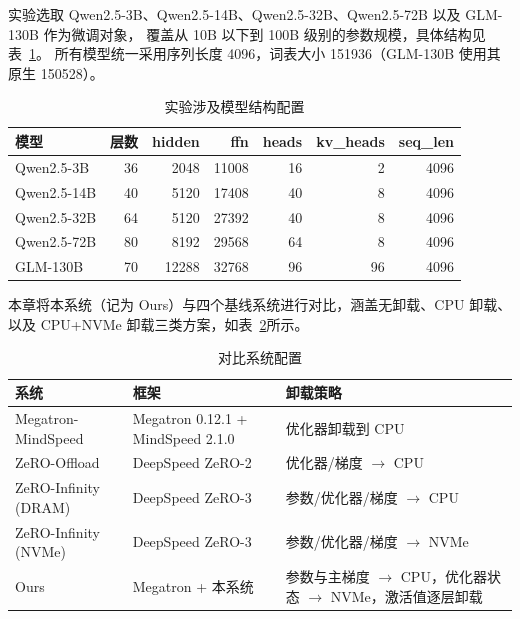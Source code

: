 \documentclass[bachelor,openany,oneside,color,AutoFakeBold=true]{buaathesis}
\begin{document}
实验选取 Qwen2.5-3B、Qwen2.5-14B、Qwen2.5-32B、Qwen2.5-72B 以及 GLM-130B 作为微调对象，
覆盖从 10B 以下到 100B 级别的参数规模，具体结构见表~\ref{tab:model}。
所有模型统一采用序列长度 4096，词表大小 151936（GLM-130B 使用其原生 150528）。

\begin{table}[!htbp]
  \centering
  \caption{实验涉及模型结构配置}
  \label{tab:model}
  \setlength{\tabcolsep}{4pt}
  \begin{tabular}{lrrrrrr}
    \toprule
    模型 & 层数 & hidden & ffn & heads & kv\_heads & seq\_len \\
    \midrule
    Qwen2.5-3B   & 36 & 2048  & 11008 & 16 & 2  & 4096 \\
    Qwen2.5-14B  & 40 & 5120  & 17408 & 40 & 8  & 4096 \\
    Qwen2.5-32B  & 64 & 5120  & 27392 & 40 & 8  & 4096 \\
    Qwen2.5-72B  & 80 & 8192  & 29568 & 64 & 8  & 4096 \\
    GLM-130B   & 70 & 12288 & 32768 & 96 & 96 & 4096 \\
    \bottomrule
  \end{tabular}
\end{table}

本章将本系统（记为 Ours）与四个基线系统进行对比，涵盖无卸载、CPU 卸载、
以及 CPU+NVMe 卸载三类方案，如表~\ref{tab:baseline}所示。

\begin{table}[!htbp]
  \centering
  \caption{对比系统配置}
  \label{tab:baseline}
  \begin{tabular}{lll}
    \toprule
    系统 & 框架 & 卸载策略 \\
    \midrule
    Megatron-MindSpeed   & Megatron 0.12.1 + MindSpeed 2.1.0 & 优化器卸载到 CPU \\
    ZeRO-Offload         & DeepSpeed ZeRO-2 & 优化器/梯度 $\rightarrow$ CPU \\
    ZeRO-Infinity (DRAM) & DeepSpeed ZeRO-3 & 参数/优化器/梯度 $\rightarrow$ CPU \\
    ZeRO-Infinity (NVMe) & DeepSpeed ZeRO-3 & 参数/优化器/梯度 $\rightarrow$ NVMe \\
    Ours               & Megatron + 本系统 & 参数与主梯度 $\rightarrow$ CPU，优化器状态 $\rightarrow$ NVMe，激活值逐层卸载 \\
    \bottomrule
  \end{tabular}
\end{table}
\end{document}
